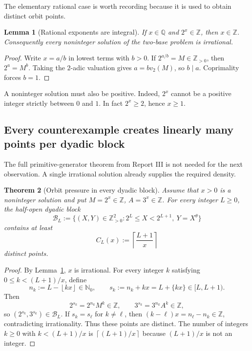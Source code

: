 \documentclass[11pt,oneside]{article}
\newtheorem{theorem}{Theorem}[section]
\newtheorem{lemma}[theorem]{Lemma}
\theoremstyle{definition}
\theoremstyle{remark}
\newcommand{\Nzero}{\mathbb N_0}
\newcommand{\Z}{\mathbb Z}
\newcommand{\Q}{\mathbb Q}
\newcommand{\tht}{\theta}
\newcommand{\floor}[1]{\left\lfloor#1\right\rfloor}
\newcommand{\ceil}[1]{\left\lceil#1\right\rceil}
\begin{document}
The elementary rational case is worth recording because it is used to obtain distinct orbit points.

\begin{lemma}[Rational exponents are integral]
\label{lem:rational-integral}
If $x\in\Q$ and $2^x\in\Z$, then $x\in\Z$.  Consequently every noninteger solution of the two-base
problem is irrational.
\end{lemma}

\begin{proof}
Write $x=a/b$ in lowest terms with $b>0$.  If $2^{a/b}=M\in\Z_{>0}$, then $2^a=M^b$.
Taking the $2$-adic valuation gives $a=bv_2(M)$, so $b\mid a$.  Coprimality forces $b=1$.
\end{proof}

A noninteger solution must also be positive.  Indeed, $2^x$ cannot be a positive integer strictly
between $0$ and $1$.  In fact $2^x\ge2$, hence $x\ge1$.

\subsection{Every counterexample creates linearly many points per dyadic block}

The full primitive-generator theorem from Report III is not needed for the next observation.  A
single irrational solution already supplies the required density.

\begin{theorem}[Orbit pressure in every dyadic block]
\label{thm:block-pressure}
Assume that $x>0$ is a noninteger solution and put $M=2^x\in\Z$, $A=3^x\in\Z$.
For every integer $L\ge0$, the half-open dyadic block
\[
  \mathcal B_L:=\{(X,Y)\in\Z_{>0}^2:2^L\le X<2^{L+1},\ Y=X^{\tht}\}
\]
contains at least
\begin{equation}
  C_L(x):=\ceil{\frac{L+1}{x}}
  \label{eq:block-count}
\end{equation}
distinct points.
\end{theorem}

\begin{proof}
By Lemma~\ref{lem:rational-integral}, $x$ is irrational.  For every integer $k$ satisfying
$0\le k<(L+1)/x$, define
\[
  n_k:=L-\floor{kx}\in\Nzero,
  \qquad s_k:=n_k+kx=L+\{kx\}\in[L,L+1).
\]
Then
\[
  2^{s_k}=2^{n_k}M^k\in\Z,
  \qquad 3^{s_k}=3^{n_k}A^k\in\Z,
\]
so $(2^{s_k},3^{s_k})\in\mathcal B_L$.  If $s_k=s_\ell$ for $k\ne\ell$, then
$(k-\ell)x=n_\ell-n_k\in\Z$, contradicting irrationality.  Thus these points are distinct.
The number of integers $k\ge0$ with $k<(L+1)/x$ is $\ceil{(L+1)/x}$ because $(L+1)/x$ is
not an integer.
\end{proof}
\end{document}
